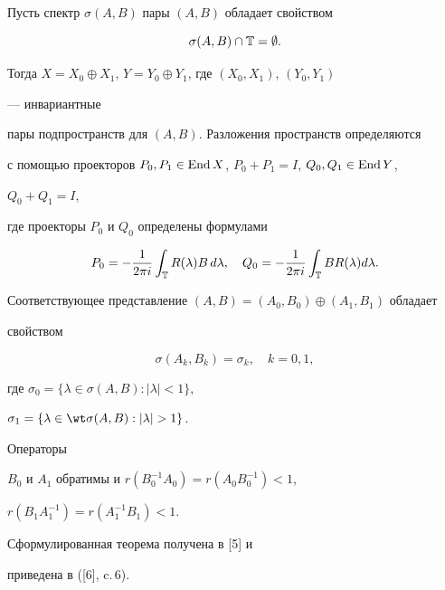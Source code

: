 \begin{thm} 


Пусть спектр $\sigma(A,B)$ пары $(A,B)$ обладает свойством 


\begin{equation} 


\sigma(A,B)\cap\Bbb T=\emptyset. 


\end{equation} 


Тогда $X=X_0\oplus X_1$, $Y=Y_0\oplus Y_1$, где $(X_0,X_1)$, $(Y_0,Y_1)$ 


--- инвариантные 


пары подпространств для $(A,B)$. Разложения пространств определяются 


с помощью проекторов $P_0,P_1\in\operatorname{End} X$, $P_0+P_1=I$, $Q_0,Q_1\in\operatorname{End} Y$, 


$Q_0+Q_1=I$, 


где проекторы $P_0$ и $Q_0$ определены формулами 


$$ 


P_0=-\frac{1}{2\pi i}\int_{\Bbb T}R(\lambda)B\,d\lambda,\quad 


Q_0=-\frac{1}{2\pi i}\int_{\Bbb T}B R(\lambda)d\lambda. 


$$ 


Соответствующее представление $(A,B)=(A_0,B_0)\oplus (A_1,B_1)$ обладает 


свойством 


$$ 


\sigma(A_k,B_k)=\sigma_k,\quad k=0,1, 


$$ 


где $\sigma_0=\{\lambda\in\sigma(A,B):|\lambda|<1\}$, 


$\sigma_1=\{\lambda\in\wt\sigma(A,B):|\lambda|>1\}$. 


Операторы 


$B_0$ и $A_1$ обратимы и $r(B^{-1}_0A_0)=r(A_0B^{-1}_0)<1$, 


$r(B_1A^{-1}_1)=r(A^{-1}_1B_1)<1$. 


\end{thm} 


 


Сформулированная теорема получена в [5] и 


приведена в ([6], c.\,6). 


 


